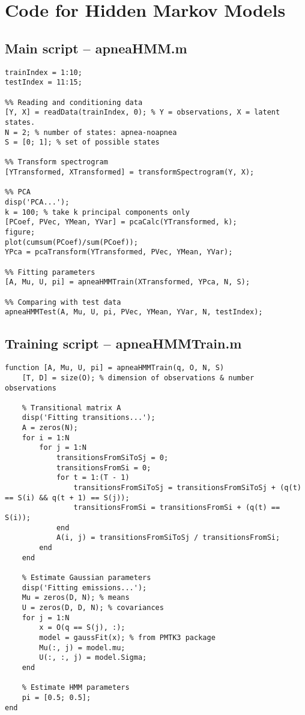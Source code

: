\chapter{Code for Hidden Markov Models}
\section{Main script -- apneaHMM.m}
\label{sec:apneaHMM}
\begin{lstlisting}
trainIndex = 1:10;
testIndex = 11:15;

%% Reading and conditioning data
[Y, X] = readData(trainIndex, 0); % Y = observations, X = latent states.
N = 2; % number of states: apnea-noapnea
S = [0; 1]; % set of possible states

%% Transform spectrogram
[YTransformed, XTransformed] = transformSpectrogram(Y, X);

%% PCA
disp('PCA...');
k = 100; % take k principal components only
[PCoef, PVec, YMean, YVar] = pcaCalc(YTransformed, k);
figure;
plot(cumsum(PCoef)/sum(PCoef));
YPca = pcaTransform(YTransformed, PVec, YMean, YVar);

%% Fitting parameters
[A, Mu, U, pi] = apneaHMMTrain(XTransformed, YPca, N, S);

%% Comparing with test data
apneaHMMTest(A, Mu, U, pi, PVec, YMean, YVar, N, testIndex);
\end{lstlisting}

\section{Training script -- apneaHMMTrain.m}
\label{sec:apneaHMMTrain}
\begin{lstlisting}
function [A, Mu, U, pi] = apneaHMMTrain(q, O, N, S)
    [T, D] = size(O); % dimension of observations & number observations

    % Transitional matrix A
    disp('Fitting transitions...');
    A = zeros(N);
    for i = 1:N
        for j = 1:N
            transitionsFromSiToSj = 0;
            transitionsFromSi = 0;
            for t = 1:(T - 1)
                transitionsFromSiToSj = transitionsFromSiToSj + (q(t) == S(i) && q(t + 1) == S(j));
                transitionsFromSi = transitionsFromSi + (q(t) == S(i));
            end
            A(i, j) = transitionsFromSiToSj / transitionsFromSi;
        end
    end

    % Estimate Gaussian parameters
    disp('Fitting emissions...');
    Mu = zeros(D, N); % means
    U = zeros(D, D, N); % covariances
    for j = 1:N
        x = O(q == S(j), :);
        model = gaussFit(x); % from PMTK3 package
        Mu(:, j) = model.mu;
        U(:, :, j) = model.Sigma;
    end

    % Estimate HMM parameters
    pi = [0.5; 0.5];
end
\end{lstlisting}

